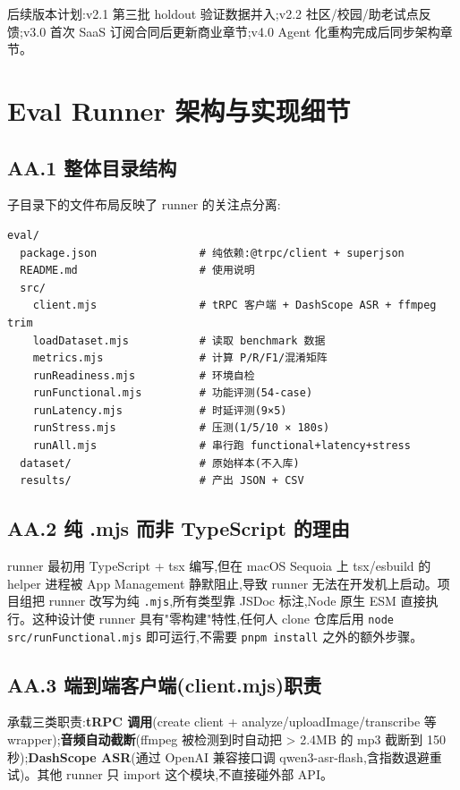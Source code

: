 \documentclass[UTF8,a4paper,12pt]{ctexart}
\newcommand{\codepath}[1]{\seqsplit{#1}}
\begin{document}
后续版本计划:v2.1 第三批 holdout 验证数据并入;v2.2 社区/校园/助老试点反馈;v3.0 首次 SaaS 订阅合同后更新商业章节;v4.0 Agent 化重构完成后同步架构章节。

\section{Eval Runner 架构与实现细节}

\subsection*{AA.1 整体目录结构}

\codepath{a30-anti/eval/} 子目录下的文件布局反映了 runner 的关注点分离:

\begin{lstlisting}[language={}]
eval/
  package.json                # 纯依赖:@trpc/client + superjson
  README.md                   # 使用说明
  src/
    client.mjs                # tRPC 客户端 + DashScope ASR + ffmpeg trim
    loadDataset.mjs           # 读取 benchmark 数据
    metrics.mjs               # 计算 P/R/F1/混淆矩阵
    runReadiness.mjs          # 环境自检
    runFunctional.mjs         # 功能评测(54-case)
    runLatency.mjs            # 时延评测(9×5)
    runStress.mjs             # 压测(1/5/10 × 180s)
    runAll.mjs                # 串行跑 functional+latency+stress
  dataset/                    # 原始样本(不入库)
  results/                    # 产出 JSON + CSV
\end{lstlisting}

\subsection*{AA.2 纯 .mjs 而非 TypeScript 的理由}

runner 最初用 TypeScript + tsx 编写,但在 macOS Sequoia 上 tsx/esbuild 的 helper 进程被 App Management 静默阻止,导致 runner 无法在开发机上启动。项目组把 runner 改写为纯 \texttt{.mjs},所有类型靠 JSDoc 标注,Node 原生 ESM 直接执行。这种设计使 runner 具有"零构建"特性,任何人 clone 仓库后用 \texttt{node src/runFunctional.mjs} 即可运行,不需要 \texttt{pnpm install} 之外的额外步骤。

\subsection*{AA.3 端到端客户端(client.mjs)职责}

\codepath{client.mjs} 承载三类职责:\textbf{tRPC 调用}(create client + analyze/uploadImage/transcribe 等 wrapper);\textbf{音频自动截断}(ffmpeg 被检测到时自动把 > 2.4MB 的 mp3 截断到 150 秒);\textbf{DashScope ASR}(通过 OpenAI 兼容接口调 qwen3-asr-flash,含指数退避重试)。其他 runner 只 import 这个模块,不直接碰外部 API。
\end{document}
